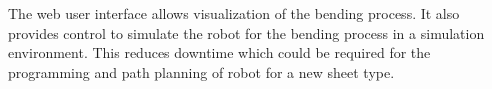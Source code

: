 The web user interface allows visualization of the bending process. It also provides control to simulate the robot for the bending process in a simulation environment. This reduces downtime which could be required for the programming and path planning of robot for a new sheet type.